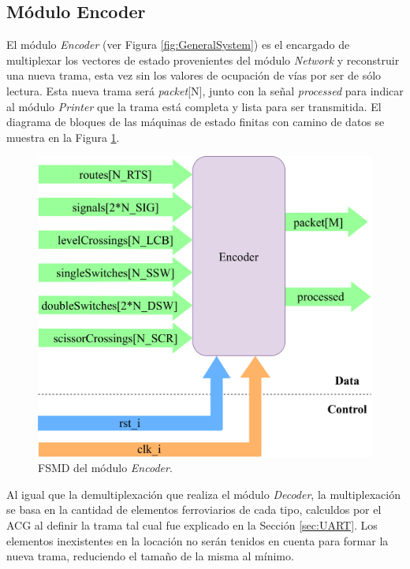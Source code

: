 \subsection{Módulo Encoder}
	\label{sec:encoder}
	
	El módulo \textit{Encoder} (ver Figura \ref{fig:GeneralSystem}) es el encargado de multiplexar los vectores de estado provenientes del módulo \textit{Network} y reconstruir una nueva trama, esta vez sin los valores de ocupación de vías por ser de sólo lectura. Esta nueva trama será \textit{packet}[N], junto con la señal \textit{processed} para indicar al módulo \textit{Printer} que la trama está completa y lista para ser transmitida. El diagrama de bloques de las máquinas de estado finitas con camino de datos se muestra en la Figura \ref{fig:Encoder_module}.
	
	\begin{figure}[H]
		\centering
		\includegraphics[width=1\textwidth]{Figuras/Encoder_module.png}
		\centering\caption{FSMD del módulo \textit{Encoder}.}
		\label{fig:Encoder_module}
	\end{figure}
	
	Al igual que la demultiplexación que realiza el módulo \textit{Decoder}, la multiplexación se basa en la cantidad de elementos ferroviarios de cada tipo, calculdos por el ACG al definir la trama tal cual fue explicado en la Sección \ref{sec:UART}. Los elementos inexistentes en la locación no serán tenidos en cuenta para formar la nueva trama, reduciendo el tamaño de la misma al mínimo.